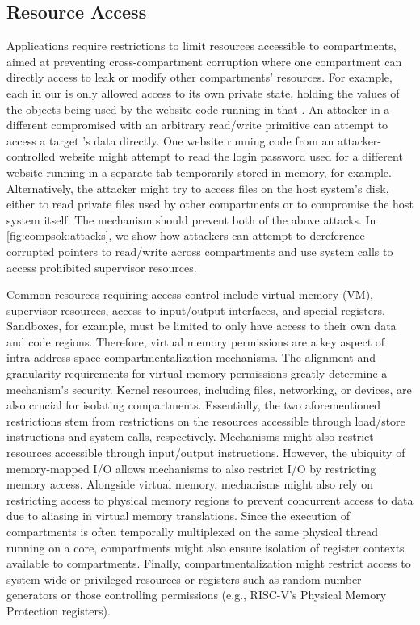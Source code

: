\subsection{Resource Access}
Applications require restrictions to limit resources accessible to 
compartments, aimed at preventing cross-compartment corruption where
one compartment can directly access to leak or modify other compartments'
resources.
For example, each \sandbox in our \browser is only allowed access to its own 
private state, holding the
values of the objects being used by the website code running in that \sandbox.
An attacker in a different compromised \sandbox with an arbitrary 
read/write primitive can attempt to access a target \sandbox's data directly.
One website running code from an attacker-controlled website 
might attempt to read the login password used for a different website running
in a separate tab temporarily stored in memory, for example.
Alternatively, the attacker might try to access files on the host system's
disk, either to read private files used by other compartments or to compromise
the host system itself.
The mechanism should prevent both of the above attacks.
In \autoref{fig:compsok:attacks}, we show how attackers can attempt to 
dereference corrupted pointers to read/write across compartments and
use system calls to access prohibited supervisor resources.

Common resources requiring access control include virtual memory (VM), 
supervisor resources, access to input/output interfaces, and special registers.
Sandboxes, for example, must be limited to only have access to their own
data and code regions.
Therefore, virtual memory permissions are a key aspect of 
intra-address space compartmentalization mechanisms.
The alignment and granularity requirements for virtual memory permissions
greatly determine a mechanism's security.
Kernel resources, including files, networking, or devices, are also crucial
for isolating compartments.
Essentially, the two aforementioned restrictions stem from restrictions on
the resources accessible through load/store instructions and system calls,
respectively.
Mechanisms might also restrict resources accessible through input/output
instructions.
However, the ubiquity of memory-mapped I/O allows mechanisms to also restrict
I/O by restricting memory access.
Alongside virtual memory, mechanisms might also rely on restricting access to
physical memory regions to prevent concurrent access to data due to aliasing
in virtual memory translations.
Since the execution of compartments is often temporally multiplexed on
the same physical thread running on a core, compartments might also ensure
isolation of register contexts available to compartments.
Finally, compartmentalization might restrict access to system-wide or privileged
resources or registers such as random number generators or those controlling 
permissions (e.g., RISC-V's Physical Memory Protection registers).

